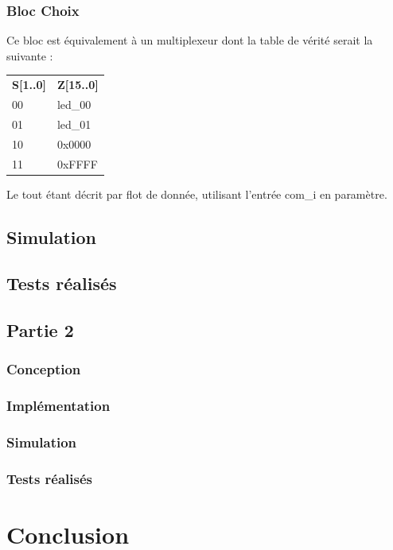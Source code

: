 \subsubsection{Bloc Choix}
Ce bloc est équivalement à un multiplexeur dont la table de vérité serait la suivante : 
\begin{center}

\begin{tabular}{l|l}
\textbf{S[1..0]} & \textbf{Z[15..0]} \\
00 & led\_00 \\
01 & led\_01 \\
10 & 0x0000 \\
11 & 0xFFFF 
\end{tabular}
\end{center}
Le tout étant décrit par flot de donnée, utilisant l'entrée com\_i en paramètre.
\subsection{Simulation}

\subsection{Tests réalisés}

\subsection{Partie 2}

\subsubsection{Conception}

\subsubsection{Implémentation}

\subsubsection{Simulation}

\subsubsection{Tests réalisés}

\section{Conclusion}


